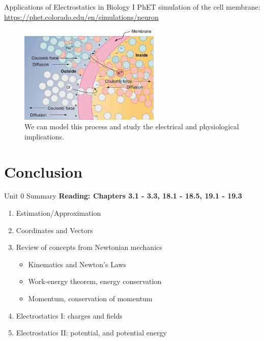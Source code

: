 \documentclass{beamer}
\begin{document}
\begin{frame}{Applications of Electrostatics in Biology I}
\small
PhET simulation of the cell membrane: \\ \url{https://phet.colorado.edu/en/simulations/neuron}
\begin{figure}
\centering
\includegraphics[width=0.6\textwidth]{figures/cell_wall.png}
\caption{\label{fig:nerve4} We can model this process and study the electrical and physiological implications.}
\end{figure}
\end{frame}

\section{Conclusion}

\begin{frame}{Unit 0 Summary}
\textbf{Reading: Chapters 3.1 - 3.3, 18.1 - 18.5, 19.1 - 19.3}
\begin{enumerate}
\item Estimation/Approximation
\item Coordinates and Vectors
\item Review of concepts from Newtonian mechanics
\begin{itemize}
\item Kinematics and Newton's Laws
\item Work-energy theorem, energy conservation
\item Momentum, conservation of momentum
\end{itemize}
\item Electrostatics I: charges and fields
\item Electrostatics II: potential, and potential energy
\end{enumerate}
\end{frame}
\end{document}
